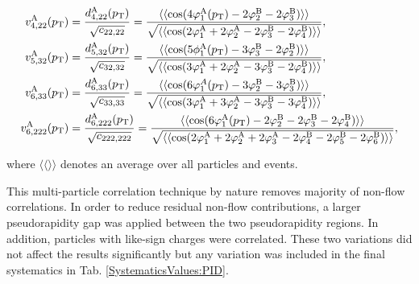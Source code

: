 \begin{align}
v_{4,22}^{\rm{A}}(p_{\rm{T}}) &= \frac{d_{4,22}^{\rm{A}}(p_{\rm{T}})}{\sqrt{c_{22,22}}} =  \frac{\langle\langle \cos(4\varphi^{\rm{A}}_{1}(p_{\rm{T}})-2\varphi^{\rm{B}}_{2}-2\varphi^{\rm{B}}_{3})\rangle\rangle}{\sqrt{\langle\langle \cos(2\varphi^{\rm{A}}_{1}+2\varphi^{\rm{A}}_{2}-2\varphi^{\rm{B}}_{3}-2\varphi^{\rm{B}}_{4}) \rangle\rangle}}, \label{Eq:VA422} \\
v_{5,32}^{\rm{A}}(p_{\rm{T}}) &= \frac{d_{5,32}^{\rm{A}}(p_{\rm{T}})}{\sqrt{c_{32,32}}} = \frac{\langle\langle \cos(5\phi^{\rm{A}}_{1}(p_{\rm{T}})-3\varphi^{\rm{B}}_{3}-2\varphi^{\rm{B}}_{2})\rangle\rangle}{\sqrt{\langle\langle \cos(3\varphi^{\rm{A}}_{1}+2\varphi^{\rm{A}}_{2}-3\varphi^{\rm{B}}_{3}-2\varphi^{\rm{B}}_{4}) \rangle\rangle}}, \label{Eq:VA532}\\
v_{6,33}^{\rm{A}}(p_{\rm{T}}) &= \frac{d_{6,33}^{\rm{A}}(p_{\rm{T}})}{\sqrt{c_{33,33}}} =\frac{\langle\langle \cos(6\varphi^{A}_{1}(p_{\rm{T}})-3\varphi^{\rm{B}}_{2}-3\varphi^{\rm{B}}_{3})\rangle\rangle}{\sqrt{\langle\langle \cos(3\varphi^{\rm{A}}_{1}+3\varphi^{\rm{A}}_{2}-3\varphi^{\rm{B}}_{3}-3\varphi^{\rm{B}}_{4}) \rangle\rangle}}, \label{Eq:VA633}\\
v_{6,222}^{\rm{A}}(p_{\rm{T}}) &= \frac{d_{6,222}^{\rm{A}}(p_{\rm{T}})}{\sqrt{c_{222,222}}} =\frac{\langle\langle \cos(6\varphi^{\rm{A}}_{1}(p_{\rm{T}})-2\varphi^{\rm{B}}_{2}-2\varphi^{\rm{B}}_{3}-2\varphi^{\rm{B}}_{4})\rangle\rangle}{\sqrt{\langle\langle \cos(2\varphi^{\rm{A}}_{1}+2\varphi^{\rm{A}}_{2}+2\varphi^{\rm{A}}_{3}-2\varphi^{\rm{B}}_{4}-2\varphi^{\rm{B}}_{5}-2\varphi^{\rm{B}}_{6}) \rangle\rangle}},
\label{Eq:VA6222}
\end{align}

where $\langle\langle\rangle\rangle$ denotes an average over all particles and events.

This multi-particle correlation technique by nature removes majority of non-flow correlations. In order to reduce residual non-flow contributions, a larger pseudorapidity gap was applied between the two pseudorapidity regions. In addition, particles with like-sign charges were correlated. These two variations did not affect the results significantly but any variation was included in the final systematics in Tab. \ref{SystematicsValues:PID}.

